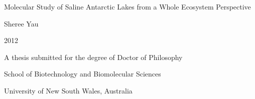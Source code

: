 \begin{titlepage}
\begin{center}
\vspace*{1in}
\LARGE{Molecular Study of Saline Antarctic Lakes from a Whole Ecosystem Perspective}
\par
\vspace{1.5in}
\large{Sheree Yau}
\par
\vspace{0.5in}
\large{2012}
\par
\vfill
A thesis submitted for the degree of Doctor of Philosophy
\par
\vspace{0.5in}
School of Biotechnology and Biomolecular Sciences
\par
University of New South Wales, Australia
\par
\vspace{0.5in}
\end{center}
\end{titlepage}
